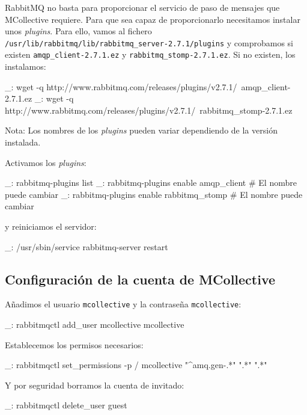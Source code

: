RabbitMQ no basta para proporcionar el servicio de paso de mensajes que MCollective requiere. Para que sea capaz de proporcionarlo necesitamos instalar unos \emph{plugins}. Para ello, vamos al fichero \texttt{/usr/lib/rabbitmq/lib/rabbitmq\_server-2.7.1/plugins} y comprobamos si existen \texttt{amqp\_client-2.7.1.ez} y \texttt{rabbitmq\_stomp-2.7.1.ez}. Si no existen, los instalamos:

\begin{bashcode}
_: wget -q http://www.rabbitmq.com/releases/plugins/v2.7.1/\
amqp_client-2.7.1.ez
_: wget -q http://www.rabbitmq.com/releases/plugins/v2.7.1/\
rabbitmq_stomp-2.7.1.ez
\end{bashcode}

Nota: Los nombres de los \emph{plugins} pueden variar dependiendo de la versión instalada.

Activamos los \emph{plugins}:

\begin{bashcode}
_: rabbitmq-plugins list
_: rabbitmq-plugins enable amqp_client           # El nombre puede cambiar
_: rabbitmq-plugins enable rabbitmq_stomp        # El nombre puede cambiar
\end{bashcode}

y reiniciamos el servidor:

\begin{bashcode}
_: /usr/sbin/service rabbitmq-server restart
\end{bashcode}


\subsection{Configuración de la cuenta de MCollective}

Añadimos el usuario \texttt{mcollective} y la contraseña \texttt{mcollective}:
\begin{bashcode}
_: rabbitmqctl add_user mcollective mcollective
\end{bashcode}

Establecemos los permisos necesarios:

\begin{bashcode}
_: rabbitmqctl set_permissions -p / mcollective "^amq.gen-.*" ".*" ".*"
\end{bashcode}

Y por seguridad borramos la cuenta de invitado:

\begin{bashcode}
_: rabbitmqctl delete_user guest
\end{bashcode}


